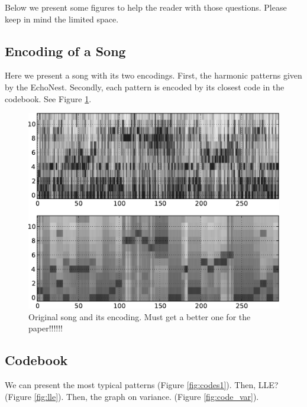 \documentclass{article}
\begin{document}
Below we present some figures to help the reader with those questions.
Please keep in mind the limited space.

\subsection{Encoding of a Song}
Here we present a song with its two encodings. First, the harmonic patterns
given by the EchoNest. Secondly, each pattern is encoded by its closest
code in the codebook. See Figure \ref{fig:encodesong}.

\begin{figure}[htb]
\begin{center}
\includegraphics[width=.9\columnwidth]{song_encoded}
\end{center}
\caption{\small{Original song and its encoding. Must get a better one for
the paper!!!!!!}}
\label{fig:encodesong}
\end{figure}

\subsection{Codebook}
We can present the most typical patterns (Figure \ref{fig:codes1}). 
Then, LLE? (Figure \ref{fig:lle}). 
Then, the graph on variance. (Figure \ref{fig:code_var}).
\end{document}
